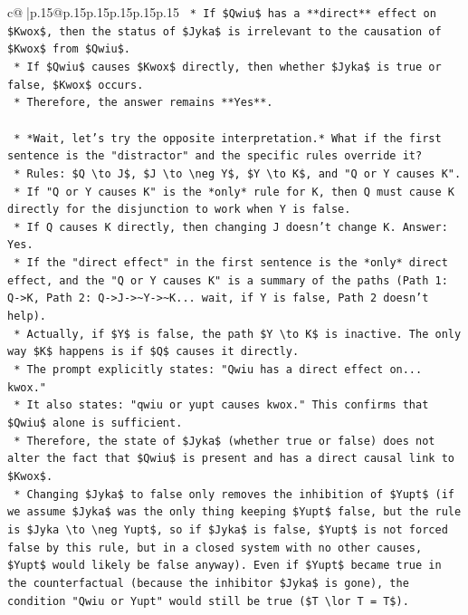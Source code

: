 \documentclass{article}
\begin{document}
{\begin{supertabular}{c@{$\;$}|p{.15\linewidth}@{}p{.15\linewidth}p{.15\linewidth}p{.15\linewidth}p{.15\linewidth}p{.15\linewidth}}
{{{\texttt{        *   If \$Qwiu\$ has a **direct** effect on \$Kwox\$, then the status of \$Jyka\$ is irrelevant to the causation of \$Kwox\$ from \$Qwiu\$.} \\
\texttt{        *   If \$Qwiu\$ causes \$Kwox\$ directly, then whether \$Jyka\$ is true or false, \$Kwox\$ occurs.} \\
\texttt{        *   Therefore, the answer remains **Yes**.} \\
\\ 
\texttt{    *   *Wait, let's try the opposite interpretation.* What if the first sentence is the "distractor" and the specific rules override it?} \\
\texttt{        *   Rules: \$Q \textbackslash{}to J\$, \$J \textbackslash{}to \textbackslash{}neg Y\$, \$Y \textbackslash{}to K\$, and "Q or Y causes K".} \\
\texttt{        *   If "Q or Y causes K" is the *only* rule for K, then Q must cause K directly for the disjunction to work when Y is false.} \\
\texttt{        *   If Q causes K directly, then changing J doesn't change K. Answer: Yes.} \\
\texttt{        *   If the "direct effect" in the first sentence is the *only* direct effect, and the "Q or Y causes K" is a summary of the paths (Path 1: Q{-}>K, Path 2: Q{-}>J{-}>\textasciitilde{}Y{-}>\textasciitilde{}K... wait, if Y is false, Path 2 doesn't help).} \\
\texttt{        *   Actually, if \$Y\$ is false, the path \$Y \textbackslash{}to K\$ is inactive. The only way \$K\$ happens is if \$Q\$ causes it directly.} \\
\texttt{        *   The prompt explicitly states: "Qwiu has a direct effect on... kwox."} \\
\texttt{        *   It also states: "qwiu or yupt causes kwox." This confirms that \$Qwiu\$ alone is sufficient.} \\
\texttt{        *   Therefore, the state of \$Jyka\$ (whether true or false) does not alter the fact that \$Qwiu\$ is present and has a direct causal link to \$Kwox\$.} \\
\texttt{        *   Changing \$Jyka\$ to false only removes the inhibition of \$Yupt\$ (if we assume \$Jyka\$ was the only thing keeping \$Yupt\$ false, but the rule is \$Jyka \textbackslash{}to \textbackslash{}neg Yupt\$, so if \$Jyka\$ is false, \$Yupt\$ is not forced false by this rule, but in a closed system with no other causes, \$Yupt\$ would likely be false anyway). Even if \$Yupt\$ became true in the counterfactual (because the inhibitor \$Jyka\$ is gone), the condition "Qwiu or Yupt" would still be true (\$T \textbackslash{}lor T = T\$).} \\
}}}
\end{supertabular}}
\end{document}
